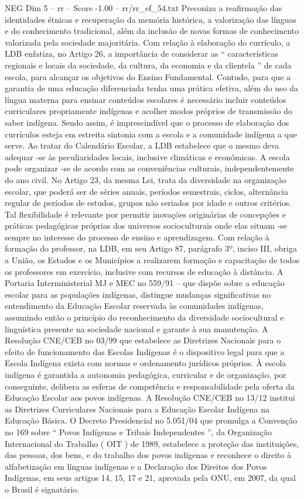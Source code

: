 \begin{textsample}{NEG Dim 5 – rr – Score -1.00 – rr/rr\_ef\_54.txt}
Preconiza a reafirmação das identidades étnicas e recuperação da memória histórica, a valorização das línguas e do conhecimento tradicional, além da inclusão de novas formas de conhecimento valorizada pela sociedade majoritária.
Com relação à elaboração do currículo, a LDB enfatiza, no Artigo 26, a importância de considerar as “ características regionais e locais da sociedade, da cultura, da economia e da clientela ” de cada escola, para alcançar os objetivos do Ensino Fundamental.
Contudo, para que a garantia de uma educação diferenciada tenha uma prática efetiva, além do uso da língua materna para ensinar conteúdos escolares é necessário incluir conteúdos curriculares propriamente indígenas e acolher modos próprios de transmissão do saber indígena.
Sendo assim, é imprescindível que o processo de elaboração dos currículos esteja em estreita sintonia com a escola e a comunidade indígena a que serve.
Ao tratar do Calendário Escolar, a LDB estabelece que o mesmo deva adequar -se às peculiaridades locais, inclusive climáticas e econômicas.
A escola pode organizar -se de acordo com as conveniências culturais, independentemente do ano civil.
No Artigo 23, da mesma Lei, trata da diversidade na organização escolar, que poderá ser de séries anuais, períodos semestrais, ciclos, alternância regular de períodos de estudos, grupos não seriados por idade e outros critérios.
Tal flexibilidade é relevante por permitir inovações originárias de concepções e práticas pedagógicas próprias dos universos socioculturais onde elas situam -se sempre no interesse do processo de ensino e aprendizagem.
Com relação à formação do professor, na LDB, em seu Artigo 87, parágrafo 3º, inciso III, obriga a União, os Estados e os Municípios a realizarem formação e capacitação de todos os professores em exercício, inclusive com recursos de educação à distância.
A Portaria Interministerial MJ e MEC no 559/91 – que dispõe sobre a educação escolar para as populações indígenas, distingue mudanças significativas no entendimento da Educação Escolar reservada às comunidades indígenas, assumindo então o princípio do reconhecimento da diversidade sociocultural e linguística presente na sociedade nacional e garante à sua manutenção.
A Resolução CNE/CEB no 03/99 que estabelece as Diretrizes Nacionais para o efeito de funcionamento das Escolas Indígenas é o dispositivo legal para que a Escola Indígena exista com normas e ordenamento jurídicos próprios.
À escola indígena é garantida a autonomia pedagógica, curricular e de organização, por conseguinte, delibera as esferas de competência e responsabilidade pela oferta da Educação Escolar aos povos indígenas.
A Resolução CNE/CEB no 13/12 institui as Diretrizes Curriculares Nacionais para a Educação Escolar Indígena na Educação Básica.
O Decreto Presidencial no 5.051/04 que promulga a Convenção no 169 sobre “ Povos Indígenas e Tribais Independentes ”, da Organização Internacional do Trabalho ( OIT ) de 1989, estabelece a proteção das instituições, das pessoas, dos bens, e do trabalho dos povos indígenas e reconhece o direito à alfabetização em línguas indígenas e a Declaração dos Direitos dos Povos Indígenas, em seus artigos 14, 15, 17 e 21, aprovada pela ONU, em 2007, da qual o Brasil é signatário.

\end{textsample}
